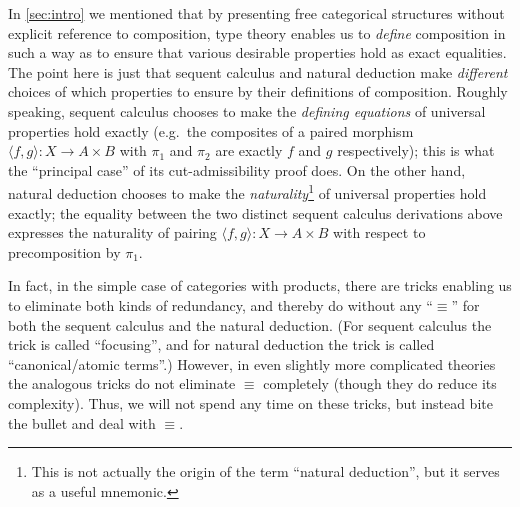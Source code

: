 \documentclass{book}
\def\pair#1#2{\langle #1,#2\rangle}
\begin{document}
\begin{rmk}
  In \cref{sec:intro} we mentioned that by presenting free categorical structures without explicit reference to composition, type theory enables us to \emph{define} composition in such a way as to ensure that various desirable properties hold as exact equalities.
  The point here is just that sequent calculus and natural deduction make \emph{different} choices of which properties to ensure by their definitions of composition.
  Roughly speaking, sequent calculus chooses to make the \emph{defining equations} of universal properties hold exactly (e.g.\ the composites of a paired morphism $\pair f g : X \to A\times B$ with $\pi_1$ and $\pi_2$ are exactly $f$ and $g$ respectively); this is what the ``principal case'' of its cut-admissibility proof does.
  On the other hand, natural deduction chooses to make the \emph{naturality}\footnote{This is not actually the origin of the term ``natural deduction'', but it serves as a useful mnemonic.} of universal properties hold exactly; the equality between the two distinct sequent calculus derivations above expresses the naturality of pairing $\pair f g : X \to A\times B$ with respect to precomposition by $\pi_1$.
\end{rmk}

In fact, in the simple case of categories with products, there are tricks enabling us to eliminate {both} kinds of redundancy, and thereby do without any ``$\equiv$'' for both the sequent calculus and the natural deduction.
(For sequent calculus the trick is called ``focusing'', and for natural deduction the trick is called ``canonical/atomic terms''.)
However, in even slightly more complicated theories the analogous tricks do not eliminate $\equiv$ completely (though they do reduce its complexity).
Thus, we will not spend any time on these tricks, but instead bite the bullet and deal with $\equiv$.
\end{document}
